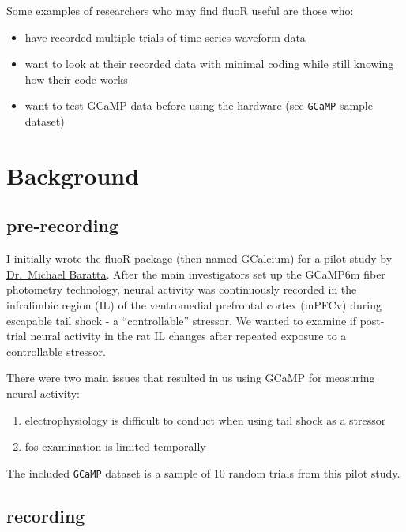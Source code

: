 \documentclass[
]{book}
\providecommand{\tightlist}{%
  \setlength{\itemsep}{0pt}\setlength{\parskip}{0pt}}
\begin{document}
Some examples of researchers who may find fluoR useful are those who:

\begin{itemize}
\tightlist
\item
  have recorded multiple trials of time series waveform data
\item
  want to look at their recorded data with minimal coding while still knowing how their code works
\item
  want to test GCaMP data before using the hardware (see \texttt{GCaMP} sample dataset)
\end{itemize}

\hypertarget{background}{%
\section{Background}\label{background}}

\hypertarget{index-prerecording}{%
\subsection{pre-recording}\label{index-prerecording}}

I initially wrote the fluoR package (then named GCalcium) for a pilot study by \href{https://www.colorado.edu/psych-neuro/michael-baratta}{Dr.~Michael Baratta}. After the main investigators set up the GCaMP6m fiber photometry technology, neural activity was continuously recorded in the infralimbic region (IL) of the ventromedial prefrontal cortex (mPFCv) during escapable tail shock - a ``controllable'' stressor. We wanted to examine if post-trial neural activity in the rat IL changes after repeated exposure to a controllable stressor.

There were two main issues that resulted in us using GCaMP for measuring neural activity:

\begin{enumerate}
\def\labelenumi{\arabic{enumi}.}
\tightlist
\item
  electrophysiology is difficult to conduct when using tail shock as a stressor
\item
  fos examination is limited temporally
\end{enumerate}

The included \texttt{GCaMP} dataset is a sample of 10 random trials from this pilot study.

\hypertarget{index-recording}{%
\subsection{recording}\label{index-recording}}
\end{document}
